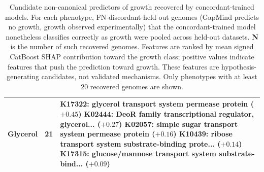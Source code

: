 \begin{table}[ht]
\begin{tabular}{|l|c|p{10.5cm}|}
\hline
Glycerol & 21 & K17322: glycerol transport system permease protein ($+0.45$) \newline K02444: DeoR family transcriptional regulator, glycerol... ($+0.27$) \newline K02057: simple sugar transport system permease protein ($+0.16$) \newline K10439: ribose transport system substrate-binding prote... ($+0.14$) \newline K17315: glucose/mannose transport system substrate-bind... ($+0.09$) \\
\hline
\end{tabular}
\caption{Candidate non-canonical predictors of growth recovered by concordant-trained models. For each phenotype, FN-discordant held-out genomes (GapMind predicts no growth, growth observed experimentally) that the concordant-trained model nonetheless classifies correctly as growth were pooled across held-out datasets. \textbf{N} is the number of such recovered genomes. Features are ranked by mean signed CatBoost SHAP contribution toward the growth class; positive values indicate features that push the prediction toward growth. These features are hypothesis-generating candidates, not validated mechanisms. Only phenotypes with at least 20 recovered genomes are shown.}
\label{tab:recovered_features}
\end{table}
